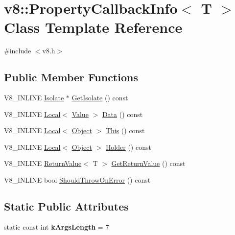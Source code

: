 \hypertarget{classv8_1_1PropertyCallbackInfo}{}\section{v8\+:\+:Property\+Callback\+Info$<$ T $>$ Class Template Reference}
\label{classv8_1_1PropertyCallbackInfo}


{\ttfamily \#include $<$v8.\+h$>$}

\subsection*{Public Member Functions}
\begin{DoxyCompactItemize}
\item 
V8\+\_\+\+I\+N\+L\+I\+NE \mbox{\hyperlink{classv8_1_1Isolate}{Isolate}} $\ast$ \mbox{\hyperlink{classv8_1_1PropertyCallbackInfo_aff7b838ede308ab8a42890962eb9271c}{Get\+Isolate}} () const
\item 
V8\+\_\+\+I\+N\+L\+I\+NE \mbox{\hyperlink{classv8_1_1Local}{Local}}$<$ \mbox{\hyperlink{classv8_1_1Value}{Value}} $>$ \mbox{\hyperlink{classv8_1_1PropertyCallbackInfo_a0156bad4329132beddee04f2d000c617}{Data}} () const
\item 
V8\+\_\+\+I\+N\+L\+I\+NE \mbox{\hyperlink{classv8_1_1Local}{Local}}$<$ \mbox{\hyperlink{classv8_1_1Object}{Object}} $>$ \mbox{\hyperlink{classv8_1_1PropertyCallbackInfo_af46300339d2f31d8dc84a06d74ed6c3c}{This}} () const
\item 
V8\+\_\+\+I\+N\+L\+I\+NE \mbox{\hyperlink{classv8_1_1Local}{Local}}$<$ \mbox{\hyperlink{classv8_1_1Object}{Object}} $>$ \mbox{\hyperlink{classv8_1_1PropertyCallbackInfo_a66b7ec267f18bd84e8baf0a0e16187b9}{Holder}} () const
\item 
V8\+\_\+\+I\+N\+L\+I\+NE \mbox{\hyperlink{classv8_1_1ReturnValue}{Return\+Value}}$<$ T $>$ \mbox{\hyperlink{classv8_1_1PropertyCallbackInfo_aa0882946929c3c4df6d131fe0d8d6746}{Get\+Return\+Value}} () const
\item 
V8\+\_\+\+I\+N\+L\+I\+NE bool \mbox{\hyperlink{classv8_1_1PropertyCallbackInfo_a82d79a9cdaac9807a0fa17331b159ce9}{Should\+Throw\+On\+Error}} () const
\end{DoxyCompactItemize}
\subsection*{Static Public Attributes}
\begin{DoxyCompactItemize}
\item 
\mbox{\label{classv8_1_1PropertyCallbackInfo_a9fc9663a2e23f9324fe61f92d1e7e5b5}} 
static const int {\bfseries k\+Args\+Length} = 7
\end{DoxyCompactItemize}
